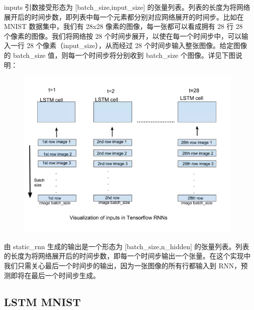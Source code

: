 \documentclass{article}
\begin{document}
inputs 引数接受形态为 [batch\_size,input\_size] 的张量列表。列表的长度为将网络展开后的时间步数，即列表中每一个元素都分别对应网络展开的时间步。比如在 MNIST 数据集中，我们有 28x28 像素的图像，每一张都可以看成拥有 28 行 28 个像素的图像。我们将网络按 28 个时间步展开，以使在每一个时间步中，可以输入一行 28 个像素（input\_size），从而经过 28 个时间步输入整张图像。给定图像的 batch\_size 值，则每一个时间步将分别收到 batch\_size 个图像。详见下图说明：
\begin{figure}[H]
	\includegraphics[scale=0.5]{tf_rnn.png}
\end{figure}
由 static\_rnn 生成的输出是一个形态为 [batch\_size,n\_hidden] 的张量列表。列表的长度为将网络展开后的时间步数，即每一个时间步输出一个张量。在这个实现中我们只需关心最后一个时间步的输出，因为一张图像的所有行都输入到 RNN，预测即将在最后一个时间步生成。
\subsection{LSTM MNIST}

\end{document}
